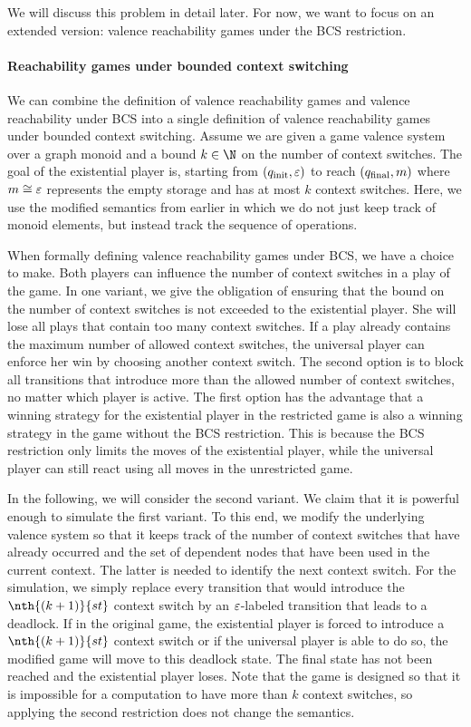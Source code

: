 \documentclass[../../diss.tex]{subfiles}
\begin{document}
We will discuss this problem in detail later.
For now, we want to focus on an extended version: valence reachability games under the BCS restriction.

\paragraph{Reachability games under bounded context switching}

We can combine the definition of valence reachability games and valence reachability under BCS into a single definition of valence reachability games under bounded context switching.
Assume we are given a game valence system over a graph monoid and a bound $k \in \N$ on the number of context switches.
The goal of the existential player is, starting from $(q_{\text{init}},\varepsilon)$ to reach $(q_{\text{final}},m)$ where $m \cong \varepsilon$ represents the empty storage and has at most $k$ context switches.
Here, we use the modified semantics from earlier in which we do not just keep track of monoid elements, but instead track the sequence of operations.

When formally defining valence reachability games under BCS, we have a choice to make.
Both players can influence the number of context switches in a play of the game.
In one variant, we give the obligation of ensuring that the bound on the number of context switches is not exceeded to the existential player.
She will lose all plays that contain too many context switches.
If a play already contains the maximum number of allowed context switches, the universal player can enforce her win by choosing another context switch.
The second option is to block all transitions that introduce more than the allowed number of context switches, no matter which player is active.
The first option has the advantage that a winning strategy for the existential player in the restricted game is also a winning strategy in the game without the BCS restriction.
This is because the BCS restriction only limits the moves of the existential player, while the universal player can still react using all moves in the unrestricted game.

In the following, we will consider the second variant.
We claim that it is powerful enough to simulate the first variant.
To this end, we modify the underlying valence system so that it keeps track of the number of context switches that have already occurred and the set of dependent nodes that have been used in the current context.
The latter is needed to identify the next context switch.
For the simulation, we simply replace every transition that would introduce the $\nth{(k+1)}{st}$ context switch by an $\varepsilon$-labeled transition that leads to a deadlock.
If in the original game, the existential player is forced to introduce a $\nth{(k+1)}{st}$ context switch or if the universal player is able to do so, the modified game will move to this deadlock state.
The final state has not been reached and the existential player loses.
Note that the game is designed so that it is impossible for a computation to have more than $k$ context switches, so applying the second restriction does not change the semantics.
\end{document}

